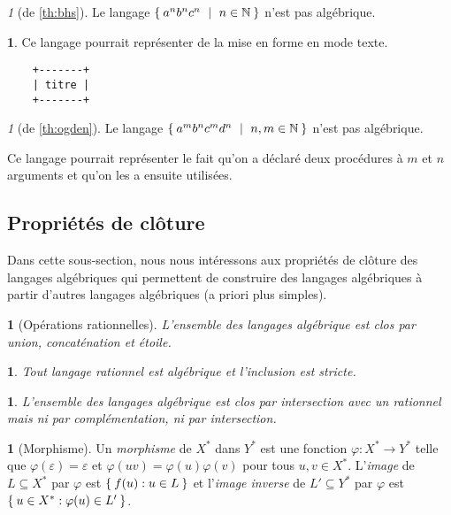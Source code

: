 \documentclass[11pt,a4paper]{article}
\theoremstyle{plain}
\theoremstyle{definition}
\newtheorem{defn}[thm]{\protect\definitionname}
\theoremstyle{definition}
\newtheorem{example}[thm]{\protect\examplename}
\theoremstyle{remark}
\newtheorem{application}[thm]{\protect\applicationname}
\theoremstyle{remark}
\theoremstyle{plain}
\theoremstyle{plain}
\newtheorem{prop}[thm]{\protect\propositionname}
\theoremstyle{plain}
\theoremstyle{remark}
\providecommand{\definitionname}{Définition}
\providecommand{\examplename}{Exemple}
\providecommand{\applicationname}{Application}
\providecommand{\propositionname}{Proposition}
\begin{document}
\begin{application}[de \ref{th:bhs}]
	Le langage $\Set{a^{n}b^{n}c^{n}\ |\ n\in\mathbb{N}}$ n'est pas algébrique.
\end{application}

\begin{example}
	Ce langage pourrait représenter de la mise en forme en mode texte. \begin{lstlisting}
	+-------+
	| titre |
	+-------+
	\end{lstlisting}
\end{example}

\begin{application}[de \ref{th:ogden}]
	Le langage $\Set{a^{m}b^{n}c^{m}d^{n}\ |\ n,m\in\mathbb{N}}$ n'est pas algébrique.
	
	Ce langage pourrait représenter le fait qu'on a déclaré deux procédures
	à $m$ et $n$ arguments et qu'on les a ensuite utilisées. %
\end{application}

\subsection{Propriétés de clôture}

Dans cette sous-section, nous nous intéressons aux propriétés de clôture des langages algébriques qui permettent de construire des langages algébriques à partir d'autres langages algébriques (a priori plus simples).

\begin{prop}[Opérations rationnelles]
	L'ensemble des langages algébrique est clos par union, concaténation et étoile.
\end{prop}

\begin{prop}
	Tout langage rationnel est algébrique et l'inclusion est stricte.
\end{prop}

\begin{prop}
	L'ensemble des langages algébrique est clos par intersection avec un rationnel mais ni par complémentation, ni par intersection.
\end{prop}

\begin{defn}[Morphisme]
	Un \emph{morphisme} de $X^*$ dans $Y^*$ est une fonction $\varphi:X^*\to Y^*$ telle que $\varphi(\varepsilon) = \varepsilon$ et $\varphi(uv)=\varphi(u)\varphi(v)$ pour tous $u,v\in X ^*$. L'\emph{image} de $L\subseteq X^*$ par $\varphi$ est $\Set{f(u) : u \in L}$ et l'\emph{image inverse} de $L'\subseteq Y^*$ par $\varphi$ est $\Set{u \in X^* : \varphi(u) \in L'}$.
\end{defn}
\end{document}
